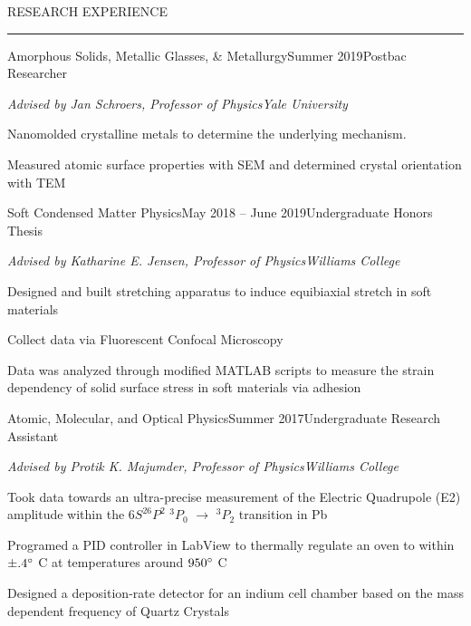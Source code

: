 \documentclass{resume} %
\renewenvironment{rSection}[1]{
	\sectionskip
	\textcolor{RoyalPurple}{\MakeUppercase{#1}}
	\sectionlineskip
	\hrule
	\begin{list}{}{
			\setlength{\leftmargin}{1.5em}
		}
		\item[]
	}{
	\end{list}
}
\begin{document}
\vspace{-1em}
	\begin{rSection}{Research Experience}
		\begin{rSubsection}{Amorphous Solids, Metallic Glasses, \& Metallurgy}{Summer 2019}{Postbac Researcher}{}
			\vspace{-.5em}
			\item[] {\em Advised by Jan Schroers, Professor of Physics}\hfill {\em Yale University}
			\item Nanomolded crystalline metals to determine the underlying mechanism.
			\item Measured atomic surface properties with SEM and determined crystal orientation with TEM
		\end{rSubsection}


		\begin{rSubsection}{Soft Condensed Matter Physics}{May 2018 -- June 2019}{Undergraduate Honors Thesis}{}
			\vspace{-.5em}
				\item[] {\em Advised by Katharine E. Jensen, Professor of Physics}\hfill {\em Williams College}
				\item Designed and built stretching apparatus to induce equibiaxial stretch in soft materials
				\item Collect data via Fluorescent Confocal Microscopy 
				\item Data was analyzed through modified MATLAB scripts to measure the strain dependency of solid surface stress in soft materials via adhesion

		\end{rSubsection}
%


		\begin{rSubsection}{Atomic, Molecular, and Optical Physics}{Summer 2017}{Undergraduate Research Assistant}{}
			\vspace{-.5em}
			\item[] {\em Advised by Protik K. Majumder, Professor of Physics}\hfill {\em Williams College}
			\item Took data towards an ultra-precise  measurement of the Electric Quadrupole (E2) amplitude within the $6S^26P^2$ $^3P_0$ $\rightarrow$ $^3P_2$ transition in Pb
			\item Programed a PID controller in LabView to thermally regulate an oven to within $\pm .4\degree$ C at temperatures around $ 950\degree $ C
			\item Designed a deposition-rate detector for an indium cell chamber based on the mass dependent frequency of Quartz Crystals
		\end{rSubsection}

\end{rSection}
\end{document}
